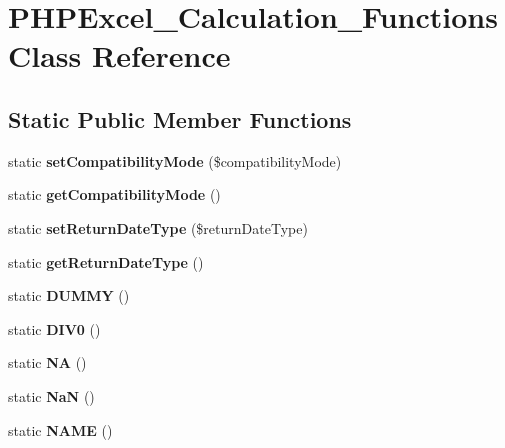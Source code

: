\section{P\+H\+P\+Excel\+\_\+\+Calculation\+\_\+\+Functions Class Reference}
\label{class_p_h_p_excel___calculation___functions}
\subsection*{Static Public Member Functions}
\begin{DoxyCompactItemize}
\item 
static {\bfseries set\+Compatibility\+Mode} (\$compatibility\+Mode)\label{class_p_h_p_excel___calculation___functions_a4e463d49c80f97edce84b9ccde8dac7c}

\item 
static {\bfseries get\+Compatibility\+Mode} ()\label{class_p_h_p_excel___calculation___functions_a90371057b06045a2318f8e85c3115e88}

\item 
static {\bfseries set\+Return\+Date\+Type} (\$return\+Date\+Type)\label{class_p_h_p_excel___calculation___functions_a75af080abcb5370f3c1356ef532e0e7c}

\item 
static {\bfseries get\+Return\+Date\+Type} ()\label{class_p_h_p_excel___calculation___functions_adf6f0cce10c83cf95079483f2090d3cc}

\item 
static {\bfseries D\+U\+M\+M\+Y} ()\label{class_p_h_p_excel___calculation___functions_a2045019bb17d76c2150a4b14bcce04ff}

\item 
static {\bfseries D\+I\+V0} ()\label{class_p_h_p_excel___calculation___functions_afbbf614e7e549a2baf4a57ca1aa14b52}

\item 
static {\bfseries N\+A} ()\label{class_p_h_p_excel___calculation___functions_a48b30b27e546966a7a89d8e4946a2479}

\item 
static {\bfseries Na\+N} ()\label{class_p_h_p_excel___calculation___functions_ad35ef66aa71a12a3f978b34c0e595a89}

\item 
static {\bfseries N\+A\+M\+E} ()\label{class_p_h_p_excel___calculation___functions_a77cb06d68178474049ab2206c75f64f3}


\end{DoxyCompactItemize}

